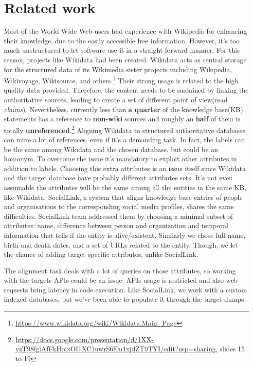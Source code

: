 \chapter{Related work}
\label{cha:1}
Most of the World Wide Web users had experience with Wikipedia for enhancing their knowledge, due to the easily accessible free information. However, it's too much unstructured to let software use it in a straight forward manner. For this reason, projects like Wikidata had been created. Wikidata acts as central storage for the structured data of its Wikimedia sister projects including Wikipedia, Wikivoyage, Wikisource, and others.\footnote{\url{https://www.wikidata.org/wiki/Wikidata:Main_Page}}
Their strong usage is related to the high quality data provided. Therefore, the content needs to be sustained by linking the authoritative sources, leading to create a set of different point of view(read \textit{claims}). Nevertheless, currently less than \textbf{a quarter} of the knowledge base(KB) statements has a reference to \textbf{non-wiki} sources and roughly an \textbf{half} of them is totally \textbf{unreferenced}.\footnote{\url{https://docs.google.com/presentation/d/1XX-yzT98fglAfFkHoixOI1XC1uwrS6f0u1xjdZT9TYI/edit?usp=sharing}, slides 15 to 19} Aligning Wikidata to structured authoritative databases can mine a lot of references, even if it's a demanding task. In fact, the labels can be the same among Wikidata and the chosen database, but could be an homonym. To overcome the issue it's mandatory to exploit other attributes in addition to labels. Choosing this extra attributes is an issue itself since Wikidata and the target database have probably different attributes sets. It's not even assumable the attributes will be the same among all the entities in the same KB, like Wikidata. SocialLink, a system that aligns knowledge base entries of people and organisations to the  corresponding social media profiles\cite{DBLP:conf/sac/NechaevCG17}, shares the same difficulties. SocialLink team addressed them by choosing a minimal subset of attributes: name, difference between person and organization and temporal information that tells if the entity is alive/existent. Similarly we chose full name, birth and death dates, and a set of URLs related to the entity. Though, we let the chance of adding target specific attributes, unlike SocialLink.

The alignment task deals with a lot of queries on those attributes, so working with the targets APIs could be an issue: APIs usage is restricted and also web requests bring latency in code execution. Like SocialLink\cite{DBLP:conf/sac/NechaevCG17}, we work with a custom indexed databases, but we've been able to populate it through the target dumps.

